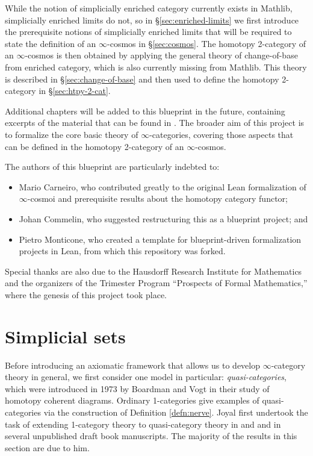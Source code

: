  While the notion of simplicially enriched category currently exists in Mathlib, simplicially enriched limits do not, so in \S\ref{sec:enriched-limits} we first introduce the prerequisite notions of simplicially enriched limits that will be required to state the definition of an $\infty$-cosmos in \S\ref{sec:cosmos}. The homotopy 2-category of an $\infty$-cosmos is then obtained by applying the general theory of change-of-base from enriched category, which is also currently missing from Mathlib. This theory is described in \S\ref{sec:change-of-base} and then used to define the homotopy 2-category in \S\ref{sec:htpy-2-cat}.

  Additional chapters will be added to this blueprint in the future, containing excerpts of the material that can be found in \cite[Chapters 2-5]{RiehlVerity:2022eo}. The broader aim of this project is to formalize the core basic theory of $\infty$-categories, covering those aspects that can be defined in the homotopy 2-category of an $\infty$-cosmos.

 The authors of this blueprint are particularly indebted to:
 \begin{itemize}
 \item Mario Carneiro, who contributed greatly to the original Lean formalization of $\infty$-cosmoi and prerequisite results about the homotopy category functor;
 \item Johan Commelin, who suggested restructuring this as a blueprint project; and
 \item  Pietro Monticone, who created a template for blueprint-driven formalization projects in Lean, from which this repository was forked.
 \end{itemize}
 Special thanks are also due to the Hausdorff Research Institute for Mathematics and the organizers of the Trimester Program ``Prospects of Formal Mathematics,'' where the genesis of this project took place.

\section{Simplicial sets}\label{sec:simplicial-sets}

Before introducing an axiomatic framework that allows us to develop $\infty$-cat\-e\-gory theory in general, we first consider one model in particular:  \emph{quasi-cat\-e\-go\-ries}, which were introduced in 1973 by Boardman and Vogt  \cite{BoardmanVogt:1973hi} in their study of homotopy coherent diagrams. Ordinary 1-categories give examples of quasi-categories via the construction of Definition \ref{defn:nerve}. Joyal first undertook the task of extending 1-category theory to quasi-category theory in \cite{Joyal:2002qk} and \cite{Joyal:2008tq} and in several unpublished draft book manuscripts. The majority of the results in this section are due to him.


